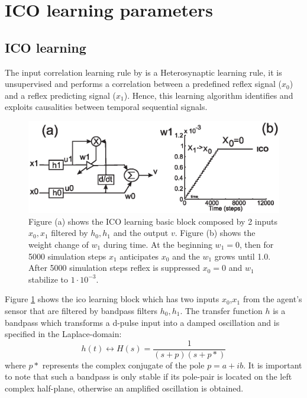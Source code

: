 
\section{ICO learning parameters \label{app:appendixICO}}

\subsection{ICO learning}
The input correlation learning rule by \citet{Porr2006ICO} is a Heterosynaptic
learning rule, it is unsupervised and performs a correlation between a predefined reflex signal
($x_{0}$) and a reflex predicting signal ($x_{1}$). Hence, this learning
algorithm identifies and exploits causalities between temporal
sequential signals.

\begin{figure}[htbp]
\begin{center}
\includegraphics[scale=0.5]{figures/socialadapt/ico.eps}
\caption[Agent learns with the ICO learning]{Figure (a) shows the ICO learning basic
block composed by 2 inputs $x_{0},x_{1}$ filtered by $h_{0},h_{1}$ and the output $v$.
Figure (b) shows the weight change of $w_{1}$ during time. At the beginning $w_{1}=0$,
then for 5000 simulation steps $x_{1}$ anticipates $x_{0}$ and the $w_{1}$ grows until 1.0.
After 5000 simulation steps reflex is suppressed $x_{0}=0$ and $w_{1}$ stabilize to $1 \cdot 10^{-3}$.
\label{fig:appendix.ICO}}
\end{center}
\end{figure}

Figure \ref{fig:appendix.ICO} shows the ico learning block which has two inputs $x_{0}$,$x_{1}$
from the agent's sensor that are filtered by bandpass filters $h_{0},h_{1}$.
The transfer function $h$ is a bandpass which transforms
a d-pulse input into a damped oscillation and is specified in the
Laplace-domain:
\begin{equation}
h(t) \leftrightarrow H(s) =\frac{1}{(s+p)(s+p*)}
\end{equation}
where $p*$ represents the complex conjugate of the pole $p = a + ib$. It is
important to note that such a bandpass is only stable if its pole-pair is
located on the left complex half-plane, otherwise an amplified oscillation is
obtained.

